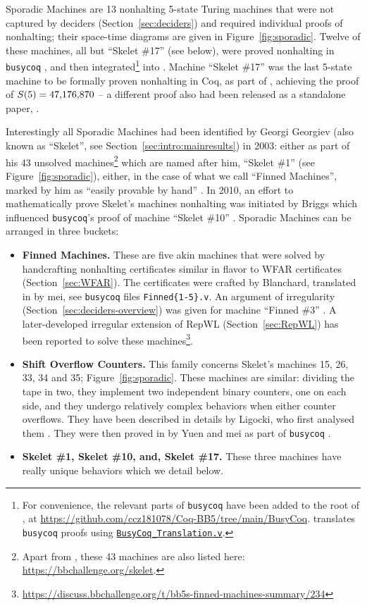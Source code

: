 Sporadic Machines are 13 nonhalting 5-state Turing machines that were not captured by deciders (Section~\ref{sec:deciders}) and required individual \Coq proofs of nonhalting; their space-time diagrams are given in Figure~\ref{fig:sporadic}. Twelve of these machines, \ie all but ``Skelet \#17'' (see below), were proved nonhalting in \texttt{busycoq} \cite{busycoq}, and then integrated\footnote{For convenience, the relevant parts of \texttt{busycoq} have been added to the root of \CoqBB, at \url{https://github.com/ccz181078/Coq-BB5/tree/main/BusyCoq}. \CoqBB translates \texttt{busycoq} proofs using \href{https://github.com/ccz181078/Coq-BB5/blob/main/CoqBB5/BB5/BusyCoq_Translation.v}{\texttt{BusyCoq\_Translation.v}}.} into \CoqBB. Machine ``Skelet \#17'' was the last 5-state machine to be formally proven nonhalting in Coq, as part of \CoqBB, achieving the proof of $S(5) = 47{,}176{,}870$ -- a different proof also had been released as a standalone paper, \cite{xu2024skelet17fifthbusy}.

Interestingly all Sporadic Machines had been identified by Georgi Georgiev (also known as ``Skelet'', see Section~\ref{sec:intro:mainresults}) in 2003: either as part of his 43 unsolved machines\footnote{Apart from \cite{Skelet_bbfind_list}, these 43 machines are also listed here: \url{https://bbchallenge.org/skelet}.} which are named after him, \eg ``Skelet \#1'' (see Figure~\ref{fig:sporadic}), either, in the case of what we call ``Finned Machines'', marked by him as ``easily provable by hand'' \cite{Skelet_bbfind_list}. In 2010, an effort to mathematically prove Skelet's machines nonhalting was initiated by Briggs which influenced \texttt{busycoq}'s proof of machine ``Skelet \#10'' \cite{DanBriggs}. Sporadic Machines can be arranged in three buckets:
\begin{itemize}
    \item \textbf{Finned Machines.} These are five akin machines that were solved by handcrafting nonhalting certificates similar in flavor to WFAR certificates (Section~\ref{sec:WFAR}). The certificates were crafted by Blanchard, translated in \Coq by mei, see \texttt{busycoq} files \texttt{Finned\{1-5\}.v}. An argument of irregularity (Section~\ref{sec:deciders-overview}) was given for machine ``Finned \#3'' \cite{irregularFinned3}. A later-developed irregular extension of RepWL (Section~\ref{sec:RepWL}) has been reported to solve these machines\footnote{\url{https://discuss.bbchallenge.org/t/bb5s-finned-machines-summary/234}}.
    \item \textbf{Shift Overflow Counters.} This family concerns Skelet's machines 15, 26, 33, 34 and 35; Figure~\ref{fig:sporadic}. These machines are similar: dividing the tape in two, they implement two independent binary counters, one on each side, and they undergo relatively complex behaviors when either counter overflows. They have been described in details by Ligocki, who first analysed them \cite{ShawnSOC}. They were then proved in \Coq by Yuen and mei as part of \texttt{busycoq} \cite{busycoq}.
    \item \textbf{Skelet \#1, Skelet \#10, and, Skelet \#17.} These three machines have really unique behaviors which we detail below.
\end{itemize}

